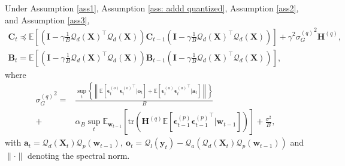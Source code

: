 \documentclass[11pt, letterpaper]{article}
\begin{document}
\begin{lemma}
    \label{update rule for eta_t^2}
    Under Assumption \ref{ass1}, Assumption \ref{ass: addd quantized}, Assumption \ref{ass2}, and Assumption \ref{ass3},
    \begin{gather*}
            \mathbf{C}_t
            \preceq \mathbb{E}\left[\left(\mathbf{I}-\gamma\frac{1}{B} {\mathcal{Q}_d(\mathbf{X})}^\top \mathcal{Q}_d(\mathbf{X}) \right)\mathbf{C}_{t-1}\left(\mathbf{I}-\gamma\frac{1}{B} {\mathcal{Q}_d(\mathbf{X})}^\top \mathcal{Q}_d(\mathbf{X}) \right)\right]+\gamma^2 {\sigma_G^{(q)}}^2\mathbf{H}^{(q)},\\
            \mathbf{B}_t
            = \mathbb{E}\left[\left(\mathbf{I}-\gamma\frac{1}{B} {\mathcal{Q}_d(\mathbf{X})}^\top \mathcal{Q}_d(\mathbf{X}) \right)\mathbf{B}_{t-1}\left(\mathbf{I}-\gamma\frac{1}{B} {\mathcal{Q}_d(\mathbf{X})}^\top \mathcal{Q}_d(\mathbf{X}) \right)\right],
    \end{gather*}
    where
    \begin{equation*}
        \begin{aligned}
            {\sigma_G^{(q)}}^2=&\frac{\sup_t \left\{\left\|\mathbb{E}\left[\boldsymbol{\epsilon}_t^{(o)}{\boldsymbol{\epsilon}_t^{(o)}}^\top|\mathbf{o}_t\right]+\mathbb{E}\left[\boldsymbol{\epsilon}_t^{(a)}{\boldsymbol{\epsilon}_t^{(a)}}^\top|\mathbf{a}_t\right] \right\|\right\}}{B}\\
            +&\alpha_B\sup_t\mathbb{E}_{\mathbf{w}_{t-1}}\left[\mathrm{tr}\left(\mathbf{H}^{(q)} \mathbb{E}\left[\boldsymbol{\epsilon}_{t-1}^{(p)}{\boldsymbol{\epsilon}_{t-1}^{(p)}}^\top \big| \mathbf{w}_{t-1}\right]\right)\right]
        +\frac{\sigma^2}{B},
        \end{aligned}
    \end{equation*}
    with $\mathbf{a}_t=\mathcal{Q}_d(\mathbf{X}_t)\mathcal{Q}_p(\mathbf{w}_{t-1}),\ \mathbf{o}_t=\mathcal{Q}_l(\mathbf{y}_t)-\mathcal{Q}_a\left(\mathcal{Q}_d(\mathbf{X}_t)\mathcal{Q}_p(\mathbf{w}_{t-1})\right)$ and $\|\cdot\|$ denoting the spectral norm.
\end{lemma}
\end{document}

